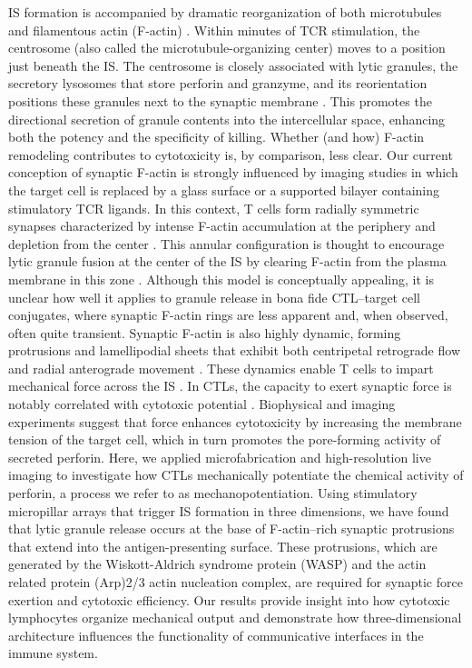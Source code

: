 IS formation is accompanied by dramatic reorganization of both microtubules and filamentous actin (F-actin) \cite{Liu2015}. Within minutes of TCR stimulation, the centrosome (also called the microtubule-organizing center) moves to a position just beneath the IS. The centrosome is closely associated with lytic granules, the secretory lysosomes that store perforin and granzyme, and its reorientation positions these granules next to the synaptic membrane \cite{Stinchcombe2007}. This promotes the directional secretion of granule contents into the intercellular space, enhancing both the potency and the specificity of killing. Whether (and how) F-actin remodeling contributes to cytotoxicity is, by comparison, less clear. Our current conception of synaptic F-actin is strongly influenced by imaging studies in which the target cell is replaced by a glass surface or a supported bilayer containing stimulatory TCR ligands. In this context, T cells form radially symmetric synapses characterized by intense F-actin accumulation at the periphery and depletion from the center \cite{Bunnell2001, LeFloch2013, Kaizuka2007, Yi2012}. This annular configuration is thought to encourage lytic granule fusion at the center of the IS by clearing F-actin from the plasma membrane in this zone \cite{Stinchcombe2007, Stinchcombe2006, Ritter2015}. Although this model is conceptually appealing, it is unclear how well it applies to granule release in bona fide CTL–target cell conjugates, where synaptic F-actin rings are less apparent and, when observed, often quite transient. Synaptic F-actin is also highly dynamic, forming protrusions and lamellipodial sheets that exhibit both centripetal retrograde flow and radial anterograde movement \cite{Yi2012, Ritter2015, Sage2012, Cai2017, Nguyen2008}. These dynamics enable T cells to impart mechanical force across the IS \cite{Husson2011, Bashour2014}. In CTLs, the capacity to exert synaptic force is notably correlated with cytotoxic potential \cite{Basu2016}. Biophysical and imaging experiments suggest that force enhances cytotoxicity by increasing the membrane tension of the target cell, which in turn promotes the pore-forming activity of secreted perforin. Here, we applied microfabrication and high-resolution live imaging to investigate how CTLs mechanically potentiate the chemical activity of perforin, a process we refer to as mechanopotentiation. Using stimulatory micropillar arrays that trigger IS formation in three dimensions, we have found that lytic granule release occurs at the base of F-actin–rich synaptic protrusions that extend into the antigen-presenting surface. These protrusions, which are generated by the Wiskott-Aldrich syndrome protein (WASP) and the actin related protein (Arp)2/3 actin nucleation complex, are required for synaptic force exertion and cytotoxic efficiency. Our results provide insight into how cytotoxic lymphocytes organize mechanical output and demonstrate how three-dimensional architecture influences the functionality of communicative interfaces in the immune system.

